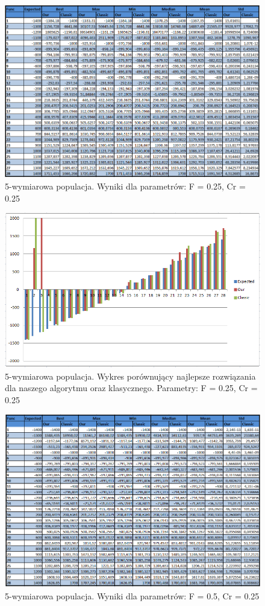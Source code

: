 \documentclass[a4paper]{article}
\begin{document}
\begin{figure}
\centering
\includegraphics[width=\textwidth]{F25Cr25L5tab.png}
\caption{5-wymiarowa populacja. Wyniki dla parametrów: F = 0.25, Cr = 0.25}
\end{figure}

\begin{figure}
\centering
\includegraphics[width=\textwidth]{F25Cr25L5chart.png}
\caption{5-wymiarowa populacja. Wykres porównujący najlepsze rozwiązania dla naszego algorytmu oraz klasycznego. Parametry: F = 0.25, Cr = 0.25}
\end{figure}

\begin{figure}
\centering
\includegraphics[width=\textwidth]{F5Cr25L5tab.png}
\caption{5-wymiarowa populacja. Wyniki dla parametrów: F = 0.5, Cr = 0.25}
\end{figure}
\end{document}
